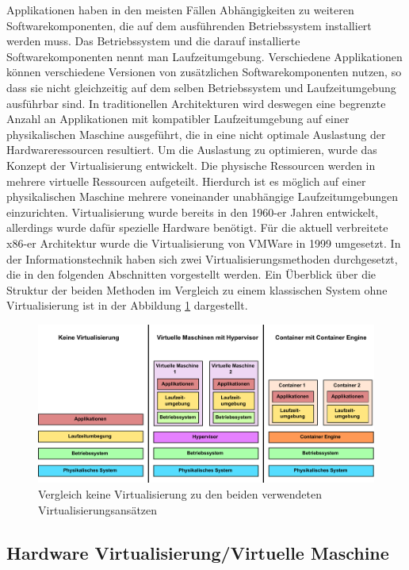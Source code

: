 Applikationen haben in den meisten Fällen Abhängigkeiten zu weiteren Softwarekomponenten, die auf dem ausführenden Betriebssystem installiert werden muss. Das Betriebssystem und die darauf installierte Softwarekomponenten nennt man Laufzeitumgebung. Verschiedene Applikationen können verschiedene Versionen von zusätzlichen Softwarekomponenten nutzen, so dass sie nicht gleichzeitig auf dem selben Betriebssystem und Laufzeitumgebung ausführbar sind. In traditionellen Architekturen wird deswegen eine begrenzte Anzahl an Applikationen mit kompatibler Laufzeitumgebung auf einer physikalischen Maschine ausgeführt, die in eine nicht optimale Auslastung der Hardwareressourcen resultiert. Um die Auslastung zu optimieren, wurde das Konzept der Virtualisierung entwickelt. Die physische Ressourcen werden in mehrere virtuelle Ressourcen aufgeteilt. Hierdurch ist es möglich auf einer physikalischen Maschine mehrere voneinander unabhängige Laufzeitumgebungen einzurichten. Virtualisierung wurde bereits in den 1960-er Jahren entwickelt, allerdings wurde dafür spezielle Hardware benötigt. Für die aktuell verbreitete x86-er Architektur wurde die Virtualisierung von VMWare in 1999 umgesetzt. \cite{Bugnion2012} In der Informationstechnik haben sich zwei Virtualisierungsmethoden durchgesetzt, die in den folgenden Abschnitten vorgestellt werden. Ein Überblick über die Struktur der beiden Methoden im Vergleich zu einem klassischen System ohne Virtualisierung ist in der Abbildung \ref{virtualisierung_optionen} dargestellt. 

\begin{figure}[htbp]
	\centering
	\includegraphics[width=\textwidth]{./content/graphics/applikation_management.pdf}
	\caption{Vergleich keine Virtualisierung zu den beiden verwendeten Virtualisierungsansätzen}
	\label{virtualisierung_optionen}
\end{figure}

\subsection{Hardware Virtualisierung/Virtuelle Maschine}
\label{Hardware Virtualisierung/Virtuelle Maschine}

